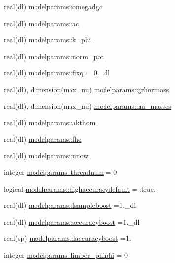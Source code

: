 \begin{DoxyCompactItemize}
\item 
real(dl) \mbox{\hyperlink{namespacemodelparams_a84817ace19c07faa219c6c62dbcabb87}{modelparams\+::omegadgc}}
\item 
real(dl) \mbox{\hyperlink{namespacemodelparams_ae997a7c4aa08ef8490836137c26170f1}{modelparams\+::ac}}
\item 
real(dl) \mbox{\hyperlink{namespacemodelparams_acb822982115ab63eb32ad1374cbc13c0}{modelparams\+::k\+\_\+phi}}
\item 
real(dl) \mbox{\hyperlink{namespacemodelparams_a616bd55af3f7197c74b52398020f9b85}{modelparams\+::norm\+\_\+pot}}
\item 
real(dl) \mbox{\hyperlink{namespacemodelparams_a7288612ee3d61c71a35e8504a6c6be79}{modelparams\+::fixq}} = 0.\+\_\+dl
\item 
real(dl), dimension(max\+\_\+nu) \mbox{\hyperlink{namespacemodelparams_aea40a307408a18a8b9e794a71c409f18}{modelparams\+::grhormass}}
\item 
real(dl), dimension(max\+\_\+nu) \mbox{\hyperlink{namespacemodelparams_a4cbebdfc6776f516e062c03bc9c26d7f}{modelparams\+::nu\+\_\+masses}}
\item 
real(dl) \mbox{\hyperlink{namespacemodelparams_a5dc004ca6b9a5a2f7372357e5a481de7}{modelparams\+::akthom}}
\item 
real(dl) \mbox{\hyperlink{namespacemodelparams_a237a630b241207072c775a0a483fccf2}{modelparams\+::fhe}}
\item 
real(dl) \mbox{\hyperlink{namespacemodelparams_a75f2e158664252c3e9cf88ad48570e99}{modelparams\+::nnow}}
\item 
integer \mbox{\hyperlink{namespacemodelparams_a33c1b20cf097d69a5c7c3dfda3dab4ab}{modelparams\+::threadnum}} = 0
\item 
logical \mbox{\hyperlink{namespacemodelparams_a248f1c00694dc15ba911d43021a79d6c}{modelparams\+::highaccuracydefault}} = .true.
\item 
real(dl) \mbox{\hyperlink{namespacemodelparams_ab2930a201db30785a690dd81ab50f4d2}{modelparams\+::lsampleboost}} =1.\+\_\+dl
\item 
real(dl) \mbox{\hyperlink{namespacemodelparams_abb9bb8b33d3369c3a551e3d4531133e1}{modelparams\+::accuracyboost}} =1.\+\_\+dl
\item 
real(sp) \mbox{\hyperlink{namespacemodelparams_a670eec63b2ba5b17870ecc149c352d95}{modelparams\+::laccuracyboost}} =1.
\item 
integer \mbox{\hyperlink{namespacemodelparams_a0a27a495392838f0bebb4cc754f548c1}{modelparams\+::limber\+\_\+phiphi}} = 0

\end{DoxyCompactItemize}
